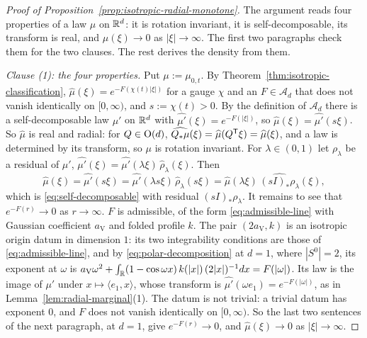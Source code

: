 \begin{proof}[Proof of Proposition~\ref{prop:isotropic-radial-monotone}]
The argument reads four properties of a law $\mu$ on $\mathbb{R}^d$: it is rotation invariant, it is
self-decomposable, its transform is real, and $\widehat\mu(\xi) \to 0$ as $|\xi| \to \infty$. The
first two paragraphs check them for the two clauses. The rest derives the density from them.

\emph{Clause (1): the four properties.} Put $\mu := \mu_{0,t}$. By
Theorem~\ref{thm:isotropic-classification}, $\widehat\mu(\xi) = e^{-F(\chi(t)|\xi|)}$ for a gauge $\chi$
and an $F \in \mathcal{A}_d$ that does not vanish identically on $[0,\infty)$, and
$s := \chi(t) > 0$. By the definition of $\mathcal{A}_d$ there is a self-decomposable law $\mu'$
on $\mathbb{R}^d$ with $\widehat{\mu'}(\xi) = e^{-F(|\xi|)}$, so $\widehat\mu(\xi) = \widehat{\mu'}(s\xi)$.
So $\widehat\mu$ is real and radial: for $Q \in \mathrm{O}(d)$,
$\widehat{Q_*\mu}(\xi) = \widehat\mu(Q^{\mathsf{T}}\xi) = \widehat\mu(\xi)$, and a law is determined by its
transform, so $\mu$ is rotation invariant. For $\lambda \in (0,1)$ let $\rho_\lambda$ be a residual
of $\mu'$, $\widehat{\mu'}(\xi) = \widehat{\mu'}(\lambda\xi)\,\widehat\rho_\lambda(\xi)$. Then
\[
  \widehat\mu(\xi) = \widehat{\mu'}(s\xi) = \widehat{\mu'}(\lambda s\xi)\,\widehat\rho_\lambda(s\xi)
   = \widehat\mu(\lambda\xi)\,\widehat{(sI)_*\rho_\lambda}(\xi) ,
\]
which is \ref{eq:self-decomposable} with residual $(sI)_*\rho_\lambda$. It remains to see that
$e^{-F(r)} \to 0$ as $r \to \infty$. $F$ is admissible, of the form \ref{eq:admissible-line} with
Gaussian coefficient $a_{\mathrm V}$ and folded profile $k$. The pair $(2a_{\mathrm V}, k)$ is an
isotropic origin datum in dimension $1$: its two integrability conditions are those of
\ref{eq:admissible-line}, and by \ref{eq:polar-decomposition} at $d = 1$, where $|S^0| = 2$, its
exponent at $\omega$ is
$a_{\mathrm V}\omega^2 + \int_{\mathbb{R}}(1 - \cos\omega x)\,k(|x|)\,(2|x|)^{-1}dx = F(|\omega|)$. Its
law is the image of $\mu'$ under $x \mapsto \langle e_1, x\rangle$, whose transform is
$\widehat{\mu'}(\omega e_1) = e^{-F(|\omega|)}$, as in Lemma~\ref{lem:radial-marginal}(1). The datum is
not trivial: a trivial datum has exponent $0$, and $F$ does not vanish identically on $[0,\infty)$.
So the last two sentences of the next paragraph, at $d = 1$, give $e^{-F(r)} \to 0$, and
$\widehat\mu(\xi) \to 0$ as $|\xi| \to \infty$.


\end{proof}
